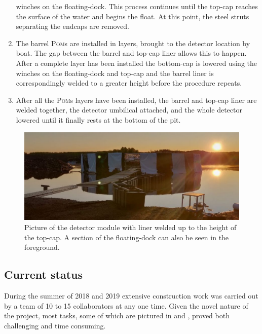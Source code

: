 \begin{enumerate}
          winches on the floating-dock. This process continues until the top-cap reaches the
          surface of the water and begins the float. At this point, the steel struts separating
          the endcaps are removed.
    \item The barrel \textsc{Pom}s are installed in layers, brought to the detector location by
          boat. The gap between the barrel and top-cap liner allows this to happen. After a
          complete layer has been installed the bottom-cap is lowered using the winches on the
          floating-dock and top-cap and the barrel liner is correspondingly welded to a greater
          height before the procedure repeats.
    \item After all the \textsc{Pom}s layers have been installed, the barrel and top-cap liner are
          welded together, the detector umbilical attached, and the whole detector lowered until
          it finally rests at the bottom of the pit.
\end{enumerate}

\begin{figure} %
    \includegraphics[width=\textwidth]{diagrams/4-chips/chips_with_liner_sun.pdf}
    \caption[Picture of the \chipsfive detector module with liner]
    {Picture of the \chipsfive detector module with liner welded up to the height of the top-cap.
        A section of the floating-dock can also be seen in the foreground.}
    \label{fig:chips_with_liner}
\end{figure}

\subsection{Current status} %
\label{sec:chips_detector_status} %

During the summer of 2018 and 2019 extensive \chipsfive construction work was carried out by a
team of 10 to 15 collaborators at any one time. Given the novel nature of the project, most tasks,
some of which are pictured in  and , proved both
challenging and time consuming.

